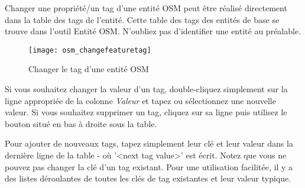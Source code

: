 Changer une propriété/un tag d'une entité OSM peut être réalisé directement dans la table des tags de l'entité. Cette table des tags des entités de base se trouve dans l'outil Entité OSM. N'oubliez pas d'identifier une entité au préalable.

\begin{figure}[ht]
   \centering
   \texttt{[image: osm\_changefeaturetag]}
   \caption{Changer le tag d'une entité OSM \nixcaption}\label{fig:osmchfeattag}
\end{figure}

Si vous souhaitez changer la valeur d'un tag, double-cliquez simplement sur la ligne appropriée de la colonne \textit{Valeur} et tapez ou sélectionnez une nouvelle valeur. Si vous souhaitez supprimer un tag, cliquez sur sa ligne puis utilisez le bouton  situé en bas à droite sous la table.

Pour ajouter de nouveaux tags, tapez simplement leur clé et leur valeur dans la dernière ligne de la table - où '<next tag value>' est écrit. Notez que vous ne pouvez pas changer la clé d'un tag existant. Pour une utilisation facilitée, il y a des listes déroulantes de toutes les clés de tag existantes et leur valeur typique.


